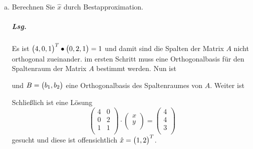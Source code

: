 \documentclass{scrreprt}
\begin{document}
\begin{enumerate}[(a)]
\item Berechnen Sie $\hat{x}$ durch Bestapproximation.

  \subparagraph{Lsg.} Es ist $\qty\big(4, 0, 1)^T \bullet \qty\big(0, 2, 1) = 1$
  und damit sind die Spalten der Matrix $A$ nicht orthogonal zueinander.
  im ersten Schritt muss eine Orthogonalbasis für den Spaltenraum der Matrix
  $A$ bestimmt werden.
  Nun ist
  und $B = \qty\big(b_1, b_2)$ eine Orthogonalbasis des Spaltenraumes von $A$.
  Weiter ist
  Schließlich ist eine Lösung
  \[
    \begin{pmatrix}
      4 & 0 \\
      0 & 2 \\
      1 & 1 \\
    \end{pmatrix} \cdot \begin{pmatrix}
      x \\
      y \\
    \end{pmatrix} =  \begin{pmatrix}
      4 \\
      4 \\
      3 \\
    \end{pmatrix}
  \]
  gesucht und diese ist offensichtlich $\hat{x} = \qty\big(1, 2)^T$.


\end{enumerate}
\end{document}
